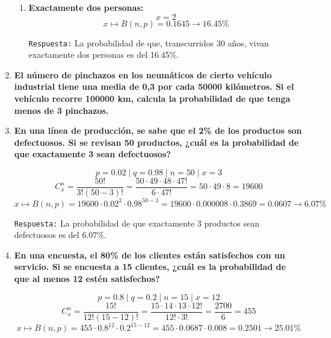 \documentclass[12pt]{article}
\begin{document}
\begin{enumerate}[label=\textbf{\arabic*.}]
\begin{enumerate}[label=\textbf{\alph*.}]
            \item \textbf{Exactamente dos personas:}
            \[x = 2\]
            \[x \mapsto B(n, p) = 0.1645 \rightarrow 16.45\%\]

            \texttt{Respuesta:} La probabilidad de que, transcurridos 30 años, vivan exactamente dos personas es del 16.45\%.

            
        \end{enumerate}


        \item \textbf{El número de pinchazos en los neumáticos de cierto vehículo industrial tiene una
        media de 0,3 por cada 50000 kilómetros. Si el vehículo recorre 100000 km, calcula la
        probabilidad de que tenga menos de 3 pinchazos.}

        


        \item \textbf{En una línea de producción, se sabe que el 2\% de los productos son defectuosos. Si se
        revisan 50 productos, ¿cuál es la probabilidad de que exactamente 3 sean
        defectuosos?}
        
        \[p = 0.02 \mid q = 0.98 \mid n = 50 \mid x = 3\]
            \[C^{n}_{x} = \frac{50!}{3!(50-3)!} = \frac{50\cdot 49\cdot 48\cdot 47!}{6\cdot 47!} = 50\cdot 49\cdot 8 = 19600\]
            \[x \mapsto B(n, p) = 19600 \cdot 0.02^{3} \cdot 0.98^{50-3} = 19600 \cdot 0.000008 \cdot 0.3869 = 0.0607 \rightarrow 6.07\%\]
            
            \texttt{Respuesta:} La probabilidad de que exactamente 3 productos sean defectuosos es del 6.07\%.


        \item \textbf{En una encuesta, el 80\% de los clientes están satisfechos con un servicio. Si se encuesta
        a 15 clientes, ¿cuál es la probabilidad de que al menos 12 estén satisfechos?}

        \[p = 0.8 \mid q = 0.2 \mid n = 15 \mid x = 12\]
            \[C^{n}_{x} = \frac{15!}{12!(15-12)!} = \frac{15\cdot 14\cdot 13\cdot 12!}{12!\cdot 3!} = \frac{2700}{6} = 455\]
            \[x \mapsto B(n, p) = 455 \cdot 0.8^{12} \cdot 0.2^{15-12} = 455 \cdot 0.0687 \cdot 0.008 = 0.2501 \rightarrow 25.01\%\]


\end{enumerate}
\end{document}
